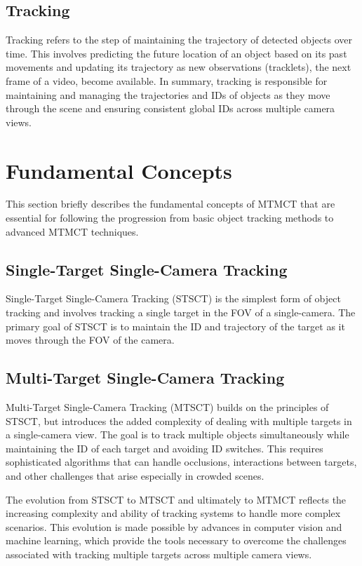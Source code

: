 \subsection{Tracking}\label{subsec:tracking}
Tracking refers to the step of maintaining the trajectory of detected objects over time. This involves predicting the future location of an object based on its past movements and updating its trajectory as new observations (tracklets), the next frame of a video, become available. In summary, tracking is responsible for maintaining and managing the trajectories and IDs of objects as they move through the scene and ensuring consistent global IDs across multiple camera views.

\section{Fundamental Concepts}\label{sec:fundamental_concepts}
This section briefly describes the fundamental concepts of MTMCT that are essential for following the progression from basic object tracking methods to advanced MTMCT techniques.

\subsection{Single-Target Single-Camera Tracking}\label{subsec:st_sct}
Single-Target Single-Camera Tracking (STSCT) is the simplest form of object tracking and involves tracking a single target in the FOV of a single-camera. The primary goal of STSCT is to maintain the ID and trajectory of the target as it moves through the FOV of the camera.

\subsection{Multi-Target Single-Camera Tracking}\label{subsec:mt_sct}
Multi-Target Single-Camera Tracking (MTSCT) builds on the principles of STSCT, but introduces the added complexity of dealing with multiple targets in a single-camera view. The goal is to track multiple objects simultaneously while maintaining the ID of each target and avoiding ID switches. This requires sophisticated algorithms that can handle occlusions, interactions between targets, and other challenges that arise especially in crowded scenes.

The evolution from STSCT to MTSCT and ultimately to MTMCT reflects the increasing complexity and ability of tracking systems to handle more complex scenarios. This evolution is made possible by advances in computer vision and machine learning, which provide the tools necessary to overcome the challenges associated with tracking multiple targets across multiple camera views.


